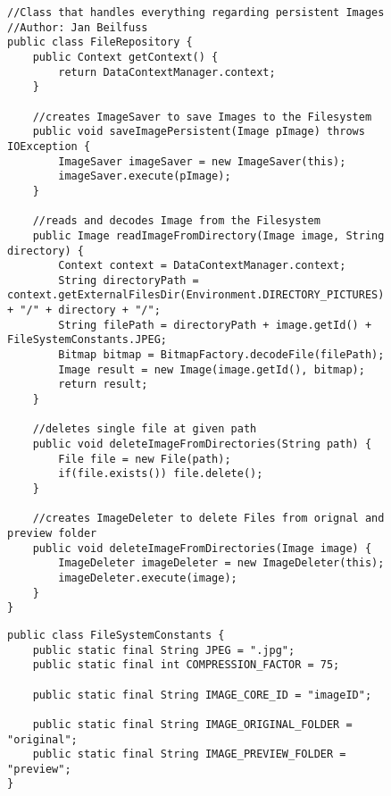 \begin{figure}[H]
\begin{lstlisting}[caption=FileRepositroy (Jan Beilfuß)]
//Class that handles everything regarding persistent Images
//Author: Jan Beilfuss
public class FileRepository {
    public Context getContext() {
        return DataContextManager.context;
    }

    //creates ImageSaver to save Images to the Filesystem
    public void saveImagePersistent(Image pImage) throws IOException {
        ImageSaver imageSaver = new ImageSaver(this);
        imageSaver.execute(pImage);
    }

    //reads and decodes Image from the Filesystem
    public Image readImageFromDirectory(Image image, String directory) {
        Context context = DataContextManager.context;
        String directoryPath = context.getExternalFilesDir(Environment.DIRECTORY_PICTURES).getAbsolutePath() + "/" + directory + "/";
        String filePath = directoryPath + image.getId() + FileSystemConstants.JPEG;
        Bitmap bitmap = BitmapFactory.decodeFile(filePath);
        Image result = new Image(image.getId(), bitmap);
        return result;
    }

    //deletes single file at given path
    public void deleteImageFromDirectories(String path) {
        File file = new File(path);
        if(file.exists()) file.delete();
    }

    //creates ImageDeleter to delete Files from orignal and preview folder
    public void deleteImageFromDirectories(Image image) {
        ImageDeleter imageDeleter = new ImageDeleter(this);
        imageDeleter.execute(image);
    }
}
\end{lstlisting}
\end{figure}

\begin{figure}[H]
\begin{lstlisting}[caption=FileSystemConstants (Jan Beilfuß)]
public class FileSystemConstants {
    public static final String JPEG = ".jpg";
    public static final int COMPRESSION_FACTOR = 75;

    public static final String IMAGE_CORE_ID = "imageID";

    public static final String IMAGE_ORIGINAL_FOLDER = "original";
    public static final String IMAGE_PREVIEW_FOLDER = "preview";
}
\end{lstlisting}
\end{figure}

